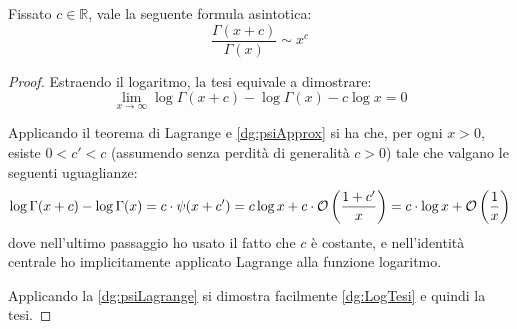 \begin{corollary}\label{dg:RapportoAsint}
	Fissato $c\in\mathbb{R}$, vale la seguente formula asintotica:
	\begin{equation}
		\frac{\Gamma(x+c)}{\Gamma(x)}\sim x^c
	\end{equation}
\end{corollary}
\begin{proof}
	Estraendo il logaritmo, la tesi equivale a dimostrare:
	\begin{equation}\label{dg:LogTesi}
		\lim_{x\to\infty} \log\Gamma(x+c)-\log\Gamma(x)-c\log x =0
	\end{equation}
	
	Applicando il teorema di Lagrange e \cref{dg:psiApprox} si ha che, per ogni $x>0$, esiste $0<c'<c$ (assumendo senza
	perdità di generalità $c>0$) tale che valgano le seguenti uguaglianze:
	\begin{equation}\label{dg:psiLagrange}
		\log\Gamma(x+c)-\log\Gamma(x)=c\cdot\psi(x+c')=c\log{x}+c\cdot\mathcal{O}\left(\frac{1+c'}{x}\right)=
		c\cdot \log{x}+\mathcal{O}\left(\frac 1x\right)
	\end{equation}
	dove nell'ultimo passaggio ho usato il fatto che $c$ è costante, e nell'identità centrale ho implicitamente 
	applicato Lagrange alla funzione logaritmo.
	
	Applicando la \cref{dg:psiLagrange} si dimostra facilmente \cref{dg:LogTesi} e quindi la tesi.
\end{proof}








